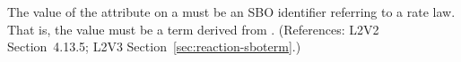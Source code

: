 The value of the  attribute on a \KineticLaw must be an SBO
identifier referring to a rate law.  That is, the value must be a term
derived from \sboratelaw.  (References: L2V2 Section~4.13.5; L2V3
Section~\ref{sec:reaction-sboterm}.)
